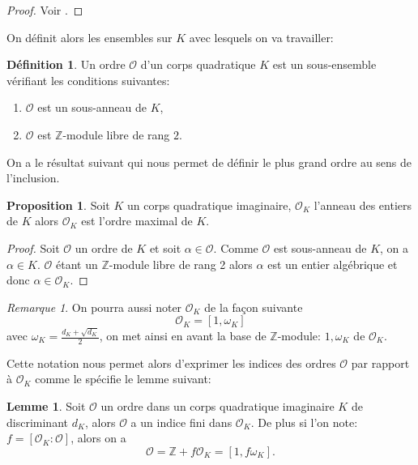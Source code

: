 \documentclass[10pt,a4paper]{book}
\theoremstyle{plain}
\theoremstyle{definition}
\newtheorem{lem}[thm]{Lemme}
\theoremstyle{definition}
\theoremstyle{definition}
\newtheorem{prop}[thm]{Proposition}
\theoremstyle{definition}
\newtheorem{defi}[thm]{Définition}
\theoremstyle{remark}
\newtheorem{rem}[thm]{Remarque}
\theoremstyle{remark}
\theoremstyle{definition}
\begin{document}
\begin{proof}
Voir \cite[exercise 5.7]{Cox89}.
\end{proof}

On définit alors les ensembles sur $K$  avec lesquels on va travailler:

\begin{defi}
Un ordre $\mathcal{O}$ d'un corps quadratique $K$ est un sous-ensemble vérifiant les conditions suivantes: 
\begin{enumerate}
\item $\mathcal{O}$ est un sous-anneau de $K$,
\item $\mathcal{O}$ est $\mathbb{Z}$-module libre de rang $2$.
\end{enumerate} 
\end{defi}

On a le résultat suivant qui nous permet de définir le plus grand ordre au sens de l'inclusion.

\begin{prop}
Soit $K$ un corps quadratique imaginaire, $\mathcal{O}_K$ l'anneau des entiers de $K$ alors $\mathcal{O}_K$ est l'ordre maximal de $K$.
\end{prop}

\begin{proof}
Soit $\mathcal{O}$ un ordre de $K$ et soit $\alpha \in \mathcal{O}$. Comme $\mathcal{O}$ est sous-anneau de $K$, on a $\alpha \in K$. $\mathcal{O}$ étant un $\mathbb{Z}$-module libre de rang 2 alors $\alpha$ est un entier algébrique et donc $\alpha \in \mathcal{O}_K$.
\end{proof}


\begin{rem}
On pourra aussi noter $\mathcal{O}_K$ de la façon suivante 
\[ \mathcal{O}_K =[1, \omega_K] \]
avec $\omega_K = \frac{d_K+\sqrt{d_K}}{2} $, on met ainsi en avant la base de $\mathbb{Z}$-module: $1, \omega_K$ de $\mathcal{O}_K$.
\end{rem}

Cette notation nous permet alors d'exprimer les indices des ordres $\mathcal{O}$ par rapport à $\mathcal{O}_K$ comme le spécifie le lemme suivant:

\begin{lem}
Soit $\mathcal{O}$ un ordre dans un corps quadratique imaginaire $K$ de discriminant $d_K$, alors $\mathcal{O}$ a un indice fini dans $\mathcal{O}_K$. De plus si l'on note: $f= [\mathcal{O}_K : \mathcal{O}]$, alors on a 
\[ \mathcal{O} = \mathbb{Z} + f\mathcal{O}_K = [1, f\omega_K]. \]
\end{lem}
\end{document}
